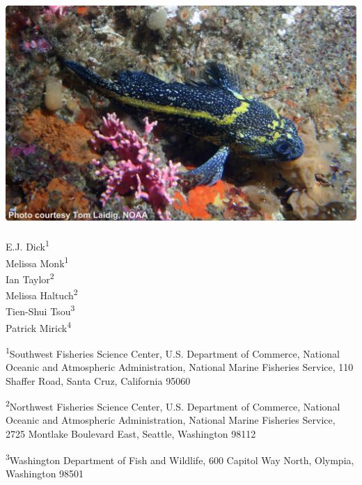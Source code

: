 
\begin{center}
\thispagestyle{empty}


\vspace{.5cm}

\includegraphics{chinarockfish_small}~\\[1cm]



E.J. Dick\textsuperscript{1}\\
Melissa Monk\textsuperscript{1}\\
Ian Taylor\textsuperscript{2}\\
Melissa Haltuch\textsuperscript{2}\\
Tien-Shui Tsou\textsuperscript{3}\\
Patrick Mirick\textsuperscript{4}\\

\vspace{.5cm}

\small
\textsuperscript{1}Southwest Fisheries Science Center, U.S. Department of Commerce, National Oceanic and Atmospheric Administration, National Marine Fisheries Service, 110 Shaffer Road, Santa Cruz, California 95060\\

\vspace{.3cm}

\textsuperscript{2}Northwest Fisheries Science Center, U.S. Department of Commerce, National Oceanic and Atmospheric Administration, National Marine Fisheries Service, 2725 Montlake Boulevard East, Seattle, Washington 98112\\

\vspace{.3cm}

\textsuperscript{3}Washington Department of Fish and Wildlife, 600 Capitol Way North, Olympia, Washington 98501\\


\end{center}
